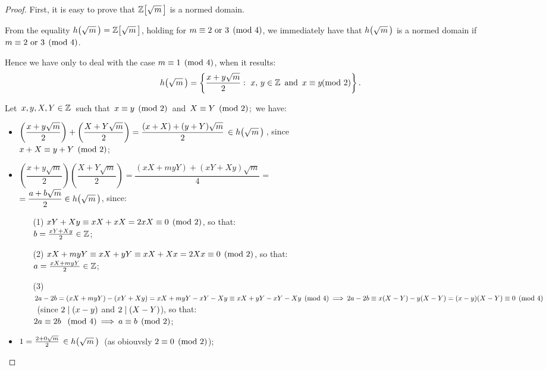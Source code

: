\begin{proof}
%
First, it is easy to prove that $\ZZ{m}$ is a normed domain.

From the equality
\mbox{$\hh{m} = \ZZ{m}$}, holding for $m \equiv 2 \textrm{ or }
3 \pmod 4$, we immediately have that $\hh{m}$ is a normed domain if
$m \equiv 2 \textrm{ or } 3 \pmod 4$.

Hence we have only to deal with the case $m \equiv 1 \pmod 4$,
when it results:
$$\hh{m} = \left\{ \frac{x + y\sqrt{m}}{2}:
\ x,\,y \in \Z \textrm{ \,and\, }
x \congruent y\!\!\! \pmod 2 \right\}.$$

Let\, $x,y,X,Y \in \mathbb{Z}$\, such that\, $x \equiv y \pmod 2$\, and\,
$X \equiv Y \pmod 2$;\, we have:

\begin{itemize}

\item
$\left(\dfrac{x + y \sqrt{m}}{2}\right) +
\left(\dfrac{X + Y \sqrt{m}}{2}\right)
= \dfrac{(x + X) + (y + Y) \sqrt{m}}{2}\,
\in \hh{m}\,$,\: since\\[6pt]
$x + X \equiv y + Y \pmod 2$;
\vspace{4pt}
\item
$\left(\dfrac{x + y \sqrt{m}}{2}\right)
\left(\dfrac{X + Y \sqrt{m}}{2}\right)
= \dfrac{(xX + myY) + (xY + Xy) \sqrt{m}}{4}
= $\\[5pt]
$ =
\dfrac{a + b\sqrt{m}}{2} \in \hh{m}$,\: since:
\begin{itemize}
   \item[(1)] $ xY +  Xy \equiv xX + xX =
   2xX \equiv 0  \pmod 2$, so that:\\
   \mbox{$b = \frac{xY + Xy}{2} \in \mathbb{Z}$;}
   \item[(2)] $ xX +  myY \equiv xX + yY
   \equiv xX + Xx  = 2Xx \equiv 0 \pmod 2$, so that:\\
   \mbox{$a = \frac{xX + myY}{2} \in \mathbb{Z}$;}
   \item[(3)] $ 2a - 2b = (xX + myY) - (xY + Xy) = xX + myY - xY - Xy
   \equiv xX + yY - xY -Xy \pmod 4 \:\Longrightarrow\: 2a - 2b \equiv
   x(X - Y) - y(X - Y) = (x - y)(X - Y) \equiv 0 \pmod 4$\,
   (since $2\mid (x - y)$ and $2 \mid (X - Y)$), so that:\\
   $2a \equiv 2b\ \pmod 4 \:\Longrightarrow\: a \equiv b \pmod 2$;
\end{itemize}

\item
$1 = \frac{2 + 0\sqrt{m}}{2}\, \in \hh{m}$\,
(as obiouvsly $2 \equiv 0 \pmod 2$);


\end{itemize}
\end{proof}

